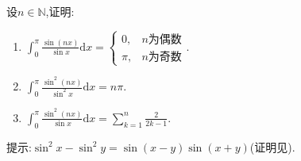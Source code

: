 \documentclass[../../main.tex]{subfiles}%
\begin{document}
\begin{proposition}\label{example:经典定积分(必记)}
设$n\in \mathbb{N}$,证明:
\begin{enumerate}[(1)]
\item $\int_0^{\pi}{\frac{\sin \left( nx \right)}{\sin x}\mathrm{d}x}= 
\begin{cases}
0, & n\text{为偶数} \\
\pi, & n\text{为奇数}
\end{cases}.$

\item $\int_0^{\pi}{\frac{\sin ^2\left( nx \right)}{\sin ^2x}}\mathrm{d}x=n\pi$.

\item $\int_0^{\pi}{\frac{\sin ^2\left( nx \right)}{\sin x}}\mathrm{d}x=\sum_{k=1}^n{\frac{2}{2k-1}}$.
\end{enumerate}
\end{proposition}
\begin{note}
提示:$\sin ^2x-\sin ^2y=\sin \left( x-y \right) \sin \left( x+y \right)$(证明见).
\end{note}
\end{document}

